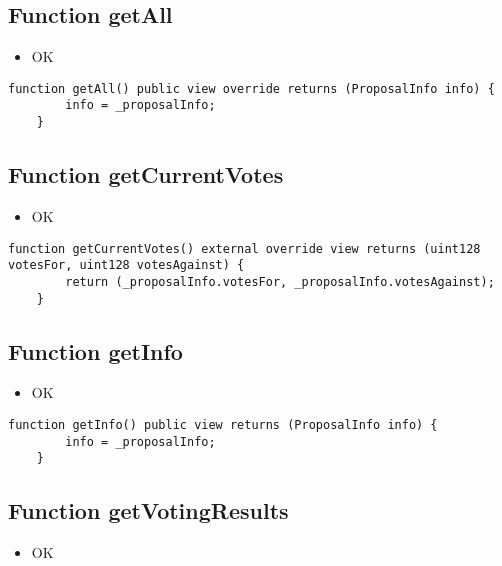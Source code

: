 \subsection{Function getAll}

\begin{itemize}
\item OK
\end{itemize}

\begin{lstlisting}[firstnumber=199]
    function getAll() public view override returns (ProposalInfo info) {
        info = _proposalInfo;
    }
\end{lstlisting}

\subsection{Function getCurrentVotes}

\begin{itemize}
\item OK
\end{itemize}

\begin{lstlisting}[firstnumber=212]
    function getCurrentVotes() external override view returns (uint128 votesFor, uint128 votesAgainst) {
        return (_proposalInfo.votesFor, _proposalInfo.votesAgainst);
    }
\end{lstlisting}

\subsection{Function getInfo}

\begin{itemize}
\item OK
\end{itemize}

\begin{lstlisting}[firstnumber=208]
    function getInfo() public view returns (ProposalInfo info) {
        info = _proposalInfo;
    }
\end{lstlisting}

\subsection{Function getVotingResults}

\begin{itemize}
\item OK
\end{itemize}

